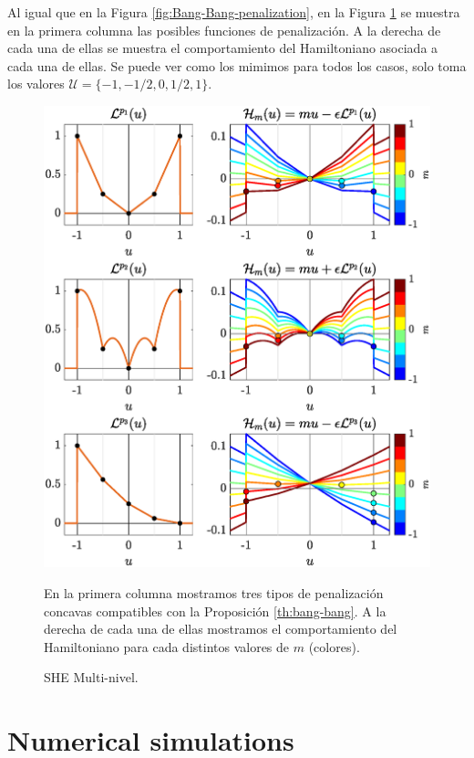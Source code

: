 \documentclass[twocolumn]{autart}    %
\begin{document}
{Al igual que en la Figura \ref{fig:Bang-Bang-penalization}, en la Figura \ref{fig:SHE-multi} se muestra en la primera columna las posibles funciones de penalización. A la derecha de cada una de ellas se muestra el comportamiento del Hamiltoniano asociada a cada una de ellas. Se puede ver como los mimimos para todos los casos, solo toma los valores $\mathcal{U} = \{-1,-1/2,0,1/2,1\}$.

\begin{figure}
    \includegraphics[scale=0.415]{img/fig04.eps}
    \caption{SHE Multi-nivel.} \footnotesize En la primera columna mostramos tres tipos de penalización concavas compatibles con la Proposición \ref{th:bang-bang}. A la derecha de cada una de ellas mostramos el comportamiento del Hamiltoniano para cada distintos valores de $m$ (colores). 
    \label{fig:SHE-multi}
\end{figure} 



}
\section{Numerical simulations}\label{sec:Simulations}
\end{document}
